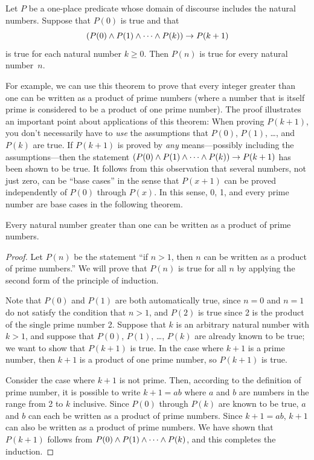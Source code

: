 \begin{theorem}
Let $P$ be a one-place predicate whose domain of discourse includes
the natural numbers.  Suppose that $P(0)$ is true and that
\[(P(0)\wedge P(1)\wedge\cdots\wedge P(k))\rightarrow P(k+1)\]
is true for each natural number $k\geq 0$.  
Then $P(n)$ is true for every natural number~$n$.
\end{theorem}

For example, we can use this theorem to prove that every integer greater
than one can be written as a product of prime numbers (where a
number that is itself prime is considered to be a product of
one prime number).  The proof illustrates an important point about
applications of this theorem:  When proving $P(k+1)$, you don't necessarily
have to \emph{use} the assumptions that $P(0)$, $P(1)$, \dots, and $P(k)$
are true.  If $P(k+1)$ is proved by \emph{any} means---possibly including the
assumptions---then the statement $(P(0)\wedge P(1)\wedge\cdots\wedge P(k))\rightarrow P(k+1)$
has been shown to be true.  It follows from this observation that
several numbers, not just zero, can be ``base cases'' in
the sense that $P(x+1)$ can be proved independently of $P(0)$ through 
$P(x)$.  In this sense, 0, 1, and every prime number are base cases
in the following theorem.

\begin{theorem}
Every natural number greater than one can be written as a product of
prime numbers.
\end{theorem}
\begin{proof}
Let $P(n)$ be the statement ``if $n>1$, then $n$ can be written as a 
product of prime numbers.''  We will prove that $P(n)$ is true for all
$n$ by applying the second form of the principle of induction.

Note that $P(0)$ and $P(1)$ are both automatically true, since $n=0$ and $n=1$
do not satisfy the condition that $n>1$, and $P(2)$ is true
since 2 is the product of the single prime number 2.  Suppose that $k$ is an arbitrary
natural number with $k>1$, and suppose that $P(0)$, $P(1)$, \dots, $P(k)$
are already known to be true; we want to show that $P(k+1)$ is true.  
In the case where $k+1$ is a prime number,
then $k+1$ is a product of one prime number, so $P(k+1)$ is true.

Consider the case where $k+1$ is not prime.  Then, according to the
definition of prime number, it is possible to write $k+1=ab$ where
$a$ and $b$ are numbers in the range from 2 to $k$ inclusive.  Since
$P(0)$ through $P(k)$ are known to be true, $a$ and $b$ can
each be written as a product of prime numbers.  Since $k+1=ab$,
$k+1$ can also be written as a product of prime numbers.  We have
shown that $P(k+1)$ follows from $P(0)\wedge P(1)\wedge\cdots\wedge P(k)$,
and this completes the induction.
\end{proof}


